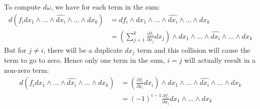 To compute $d\omega$, we have for each term in the sum:
\begin{align*}
	d \left( f_i dx_1 \wedge \ldots \wedge \widehat{dx_i} \wedge  \ldots \wedge dx_k \right) 
 		&= df_i \wedge dx_1 \wedge \ldots \wedge \widehat{dx_i} \wedge  \ldots \wedge dx_k \\ 
 		&= \left( \sum_{j=1}^k \frac{\partial f_i}{\partial x_j} dx_j \right)
 			\wedge dx_1 \wedge \ldots \wedge \widehat{dx_i} \wedge  \ldots \wedge dx_k
\end{align*}
But for $j \neq i$, there will be a duplicate $dx_j$ term and this collision will cause the term to go to zero.
Hence only one term in the sum, $i=j$ will actually result in a non-zero term:
\begin{align*}
	d \left( f_i dx_1 \wedge \ldots \wedge \widehat{dx_i} \wedge  \ldots \wedge dx_k \right) 
 		&= \left(\frac{\partial f_i}{\partial x_i} dx_i \right)
 			\wedge dx_1 \wedge \ldots \wedge \hat{dx_i} \wedge  \ldots \wedge dx_k \\ 
		&= (-1)^{i-1} \frac{\partial f_i}{\partial x_i}
 			 dx_1 \wedge \ldots \wedge dx_k
\end{align*}


